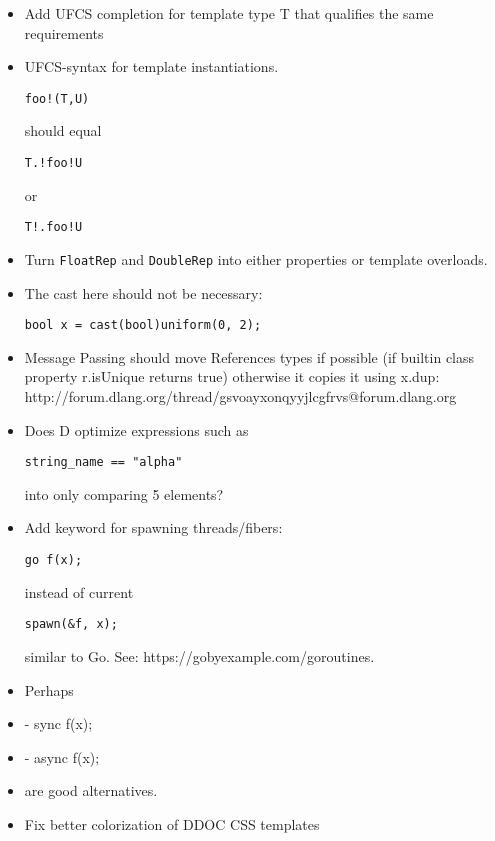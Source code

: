 \documentclass[xcolor=dvipsnames, twocolumn]{article}
\begin{document}
\begin{itemize}

\item Add UFCS completion for template type T that qualifies the same requirements

\item UFCS-syntax for template instantiations.
\begin{lstlisting}[frame=single]
foo!(T,U)
\end{lstlisting}

should equal

\begin{lstlisting}[frame=single]
T.!foo!U
\end{lstlisting}

or

\begin{lstlisting}[frame=single]
T!.foo!U
\end{lstlisting}

\item Turn \texttt{FloatRep} and \texttt{DoubleRep} into either properties or
  template overloads.

\item The cast here should not be necessary:
\begin{lstlisting}[frame=single]
bool x = cast(bool)uniform(0, 2);
\end{lstlisting}

\item Message Passing should move References types if possible (if builtin class
  property r.isUnique returns true) otherwise it copies it using x.dup:
  http://forum.dlang.org/thread/gsvoayxonqyyjlcgfrvs@forum.dlang.org

\item Does D optimize expressions such as
\begin{lstlisting}[frame=single]
string_name == "alpha"
\end{lstlisting}
into only comparing 5 elements?

\item Add keyword for spawning threads/fibers:
\begin{lstlisting}[frame=single]
go f(x);
\end{lstlisting}
instead of current
\begin{lstlisting}[frame=single]
spawn(&f, x);
\end{lstlisting}
similar to Go. See: https://gobyexample.com/goroutines.

\item Perhaps
\item - sync f(x);
\item - async f(x);
\item are good alternatives.

\item Fix better colorization of DDOC CSS templates

\end{itemize}
\end{document}
